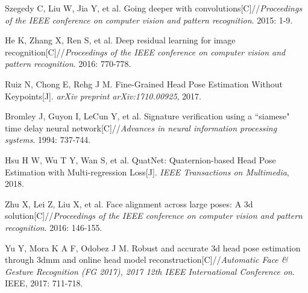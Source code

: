 \documentclass[english]{DDCLSconf}
\begin{document}
\begin{thebibliography}{0}
 Szegedy C, Liu W, Jia Y, et al. Going deeper with convolutions[C]//\emph{Proceedings of the IEEE conference on computer vision and pattern recognition}. 2015: 1-9.%

He K, Zhang X, Ren S, et al. Deep residual learning for image recognition[C]//\emph{Proceedings of the IEEE conference on computer vision and pattern recognition}. 2016: 770-778.%

 Ruiz N, Chong E, Rehg J M. Fine-Grained Head Pose Estimation Without Keypoints[J]. \emph{arXiv preprint arXiv:1710.00925}, 2017.%

 Bromley J, Guyon I, LeCun Y, et al. Signature verification using a ``siamese" time delay neural network[C]//\emph{Advances in neural information processing systems}. 1994: 737-744.%

 Hsu H W, Wu T Y, Wan S, et al. QuatNet: Quaternion-based Head Pose Estimation with Multi-regression Loss[J]. \emph{IEEE Transactions on Multimedia}, 2018.%


 Zhu X, Lei Z, Liu X, et al. Face alignment across large poses: A 3d solution[C]//\emph{Proceedings of the IEEE conference on computer vision and pattern recognition}. 2016: 146-155. %

 Yu Y, Mora K A F, Odobez J M. Robust and accurate 3d head pose estimation through 3dmm and online head model reconstruction[C]//\emph{Automatic Face \& Gesture Recognition (FG 2017), 2017 12th IEEE International Conference on}. IEEE, 2017: 711-718.%









	
%
%
%
%

\end{thebibliography}
\end{document}

